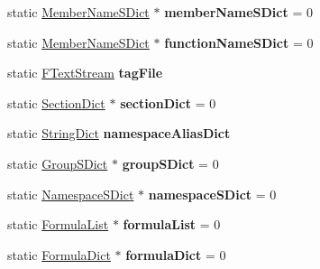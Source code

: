 \begin{DoxyCompactItemize}
\item 
\hypertarget{class_doxygen_a5edbd2ce3e57ea275c5751a17fc72f6b}{static \hyperlink{class_member_name_s_dict}{Member\-Name\-S\-Dict} $\ast$ {\bfseries member\-Name\-S\-Dict} = 0}\label{class_doxygen_a5edbd2ce3e57ea275c5751a17fc72f6b}

\item 
\hypertarget{class_doxygen_a466c09d3db497e7375fbf87523adba60}{static \hyperlink{class_member_name_s_dict}{Member\-Name\-S\-Dict} $\ast$ {\bfseries function\-Name\-S\-Dict} = 0}\label{class_doxygen_a466c09d3db497e7375fbf87523adba60}

\item 
\hypertarget{class_doxygen_a99c073c740a84dcd653829573652cf6c}{static \hyperlink{class_f_text_stream}{F\-Text\-Stream} {\bfseries tag\-File}}\label{class_doxygen_a99c073c740a84dcd653829573652cf6c}

\item 
\hypertarget{class_doxygen_a52b7e4bf19467f80dcfb4ff9fd659e53}{static \hyperlink{class_section_dict}{Section\-Dict} $\ast$ {\bfseries section\-Dict} = 0}\label{class_doxygen_a52b7e4bf19467f80dcfb4ff9fd659e53}

\item 
\hypertarget{class_doxygen_ae2fc43319cfb3ad8dae252bde6e7e013}{static \hyperlink{class_string_dict}{String\-Dict} {\bfseries namespace\-Alias\-Dict}}\label{class_doxygen_ae2fc43319cfb3ad8dae252bde6e7e013}

\item 
\hypertarget{class_doxygen_ae338166e96615f4fe99f4b15229f4c02}{static \hyperlink{class_group_s_dict}{Group\-S\-Dict} $\ast$ {\bfseries group\-S\-Dict} = 0}\label{class_doxygen_ae338166e96615f4fe99f4b15229f4c02}

\item 
\hypertarget{class_doxygen_a322d5760710e566ea14c3663babe55dc}{static \hyperlink{class_namespace_s_dict}{Namespace\-S\-Dict} $\ast$ {\bfseries namespace\-S\-Dict} = 0}\label{class_doxygen_a322d5760710e566ea14c3663babe55dc}

\item 
\hypertarget{class_doxygen_a9693b9f6c49d8299b711fe07d968e02f}{static \hyperlink{class_formula_list}{Formula\-List} $\ast$ {\bfseries formula\-List} = 0}\label{class_doxygen_a9693b9f6c49d8299b711fe07d968e02f}

\item 
\hypertarget{class_doxygen_a4a309f19a0ec34a3c69129aa768b9d27}{static \hyperlink{class_formula_dict}{Formula\-Dict} $\ast$ {\bfseries formula\-Dict} = 0}\label{class_doxygen_a4a309f19a0ec34a3c69129aa768b9d27}


\end{DoxyCompactItemize}
